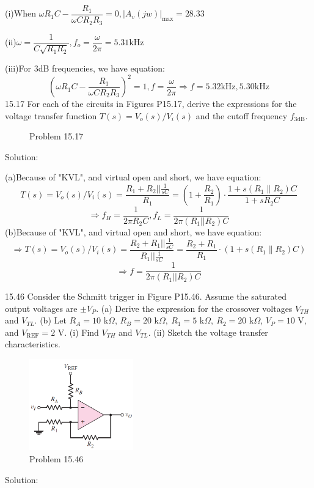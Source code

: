 \documentclass[a4paper,11pt,UTF8]{article}
\begin{document}
(i)When $\omega R_1C-\dfrac{R_1}{\omega CR_2R_3}=0, |A_v(jw)|_{\max}=28.33$

(ii)$\omega =\dfrac{1}{C\sqrt{R_1R_2}}, f_o=\dfrac{\omega}{2\pi}=5.31\mathrm{kHz}$

(iii)For 3dB frequencies, we have equation:
$$(\omega R_1C-\dfrac{R_1}{\omega CR_2R_3})^2=1, f=\frac{\omega}{2\pi}\Rightarrow f= 5.32 \mathrm{kHz}, 5.30 \mathrm{kHz}$$
15.17 For each of the circuits in Figures P15.17, derive the expressions for the voltage transfer function $T(s)=V_o(s)/V_i(s)$ and the cutoff frequency $f_{3\text{dB}}.$
\begin{figure}[H]
	\centering

	\caption{Problem 15.17}
\end{figure}
\noindent Solution:

(a)Because of "KVL", and virtual open and short, we have equation:
$$
	T(s)=V_o(s)/V_i(s)=\frac{R_1+R_2||\frac1{sC}}{R_1}=\left(1+\frac{R_{2}}{R_{1}}\right)\cdot\frac{1+s(R_{1}\parallel R_{2})C}{1+sR_{2}C}
$$
$$
	\Rightarrow f_H=\frac{1}{2\pi R_2C}, f_L=\frac{1}{2\pi (R_1||R_2)C}
$$
(b)Because of "KVL", and virtual open and short, we have equation:
$$
\Rightarrow T(s)=V_o(s)/V_i(s)=\frac{R_2+R_1||\frac1{sC}}{R_1||\frac1{sC}}=\frac{R_{2}+R_{1}}{R_{1}}\cdot\left(1+s(R_{1}\parallel R_{2})C\right)
$$
$$
	\Rightarrow f=\frac{1}{2\pi (R_1||R_2)C}
$$

15.46 Consider the Schmitt trigger in Figure P15.46. Assume the saturated output voltages are $\pm V_P.$ (a) Derive the expression for the crossover voltages $V_{TH}$ and $V_{TL}$. (b) Let $R_A=10$ k$\Omega$, $R_B=20$ k$\Omega,\:R_1=5$ k$\Omega,\:R_2=20$ k$\Omega$, $V_P=10$ V, and $V_{\mathrm{REF}}=2$ V. (i) Find $V_{TH}$ and $V_{TL}$. (ii) Sketch the voltage transfer characteristics.
\begin{figure}[H]
	\centering
	\includegraphics[width=0.4\textwidth]{15.46}
	\caption{Problem 15.46}
\end{figure}
\noindent Solution:
\end{document}
